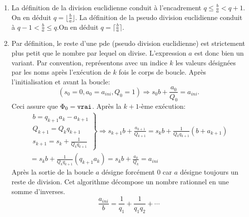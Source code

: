 \begin{enumerate}
  \item La définition de la division euclidienne conduit à l'encadrement $q\leq \frac{b}{a} < q+1$. On en déduit $q=\lfloor \frac{b}{a}\rfloor$.\newline
La définition de la pseudo division euclidienne conduit à $q-1 < \frac{b}{a} \leq  q$.\newline On en déduit $q=\lceil \frac{b}{a}\rceil$.

\item Par définition, le reste d'une pde (pseudo division euclidienne) est strictement plus petit que le nombre par lequel on divise. L'expression $a$ est donc bien un variant.\newline
Par convention, représentons avec un indice $k$ les valeurs désignées par les noms après l'exécution de $k$ fois le corps de boucle.\newline
Après l'initialisation et avant la boucle: 
\[
 \left(
 s_0 = 0,  a_0 = a_{ini} , Q_0 = 1  
 \right) \Rightarrow 
s_0b+\frac{a_0}{Q_0}=a_{ini}.
\]
Ceci assure que $\Phi_0=\verb|vrai|$.\newline
Après la $k+1$-ème exécution:
\begin{multline*}
\left. 
\begin{aligned}
b = q_{k+1}a_k - a_{k+1}\\
Q_{k+1} = Q_k q_{k+1}\\
s_{k+1} = s_k + \frac{1}{Q_k q_{k+1}}
\end{aligned}
\right\rbrace \Rightarrow
s_{k+1}b + \frac{a_{k+1}}{Q_{k+1}}=
s_kb+\frac{1}{Q_kq_{k+1}}(b+a_{k+1})\\
= s_kb+\frac{1}{Q_kq_{k+1}}(q_{k+1}a_k)
= s_kb+\frac{a_k}{Q_k} = a_{ini}
\end{multline*}
Après la sortie de la boucle $a$ désigne forcément $0$ car $a$ désigne toujours un reste de division.\newline
Cet algorithme décompose un nombre rationnel en une somme d'inverses.
\begin{displaymath}
  \frac{a_{ini}}{b} = \frac{1}{q_1}+ \frac{1}{q_1q_2}+ \cdots
\end{displaymath}

\end{enumerate}
